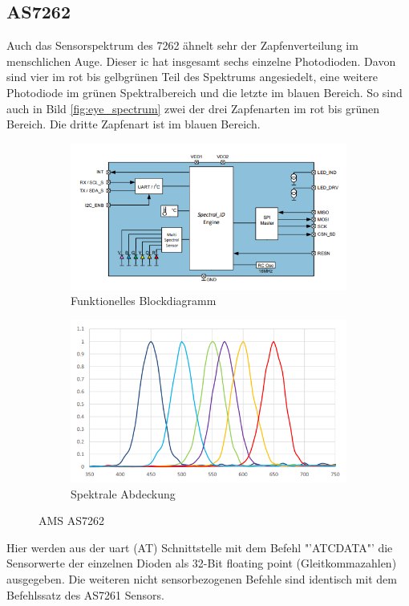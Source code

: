\documentclass[11pt]{scrartcl}
\begin{document}
\subsection{AS7262}
Auch das Sensorspektrum des 7262 ähnelt sehr der Zapfenverteilung im menschlichen Auge. Dieser \ac{ic} hat insgesamt sechs einzelne
Photodioden. Davon sind vier im rot bis gelbgrünen Teil des Spektrums angesiedelt, eine weitere Photodiode im grünen Spektralbereich und
die letzte im blauen Bereich. So sind auch in Bild \ref{fig:eye_spectrum} zwei der drei Zapfenarten im rot bis grünen Bereich. Die dritte
Zapfenart ist im blauen Bereich.
\begin{figure}[H]
    \centering
    \begin{subfigure}[b]{0.49\textwidth}
        \includegraphics[width=\textwidth]{images/AS7262_functional_blockdiagram.png}
        \caption{Funktionelles Blockdiagramm}
    \end{subfigure}
    \hfill 
    \begin{subfigure}[b]{0.49\textwidth}
        \includegraphics[width=\textwidth]{images/AS7262_spectrum.png}
        \caption{Spektrale Abdeckung}\label{fig:spec_7262}
    \end{subfigure}
    \caption[AMS AS7262]{AMS AS7262 \cite{datasheet62}}\label{fig:AS7262}
\end{figure}
\noindent
Hier werden aus der \ac{uart} (AT) Schnittstelle mit dem Befehl "'ATCDATA"' die Sensorwerte der einzelnen Dioden als 32-Bit floating point
(Gleitkommazahlen) ausgegeben. Die weiteren nicht sensorbezogenen Befehle sind identisch mit dem Befehlssatz des AS7261 Sensors.
\clearpage
\end{document}
